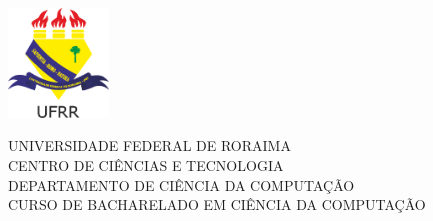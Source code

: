 \begin{titlepage}

    \begin{center}
        \includegraphics[width=0.2\textwidth]{estilo/ufrr-logo.png} %

        {\large
        UNIVERSIDADE FEDERAL DE RORAIMA\\
        CENTRO DE CIÊNCIAS E TECNOLOGIA\\
        DEPARTAMENTO DE CIÊNCIA DA COMPUTAÇÃO\\
        CURSO DE BACHARELADO EM CIÊNCIA DA COMPUTAÇÃO\\[3cm]
        }


\end{center}
\end{titlepage}
